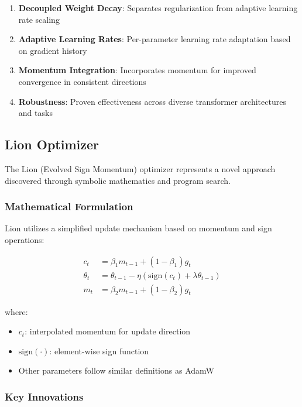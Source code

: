 \begin{enumerate}
    \item \textbf{Decoupled Weight Decay}: Separates regularization from adaptive learning rate scaling
    \item \textbf{Adaptive Learning Rates}: Per-parameter learning rate adaptation based on gradient history
    \item \textbf{Momentum Integration}: Incorporates momentum for improved convergence in consistent directions
    \item \textbf{Robustness}: Proven effectiveness across diverse transformer architectures and tasks
\end{enumerate}

\subsection{Lion Optimizer}

The Lion (Evolved Sign Momentum) optimizer \cite{chen2023symbolic} represents a novel approach discovered through symbolic mathematics and program search.

\subsubsection{Mathematical Formulation}

Lion utilizes a simplified update mechanism based on momentum and sign operations:

\begin{align}
c_t &= \beta_1 m_{t-1} + (1 - \beta_1) g_t \\
\theta_t &= \theta_{t-1} - \eta \left( \text{sign}(c_t) + \lambda \theta_{t-1} \right) \\
m_t &= \beta_2 m_{t-1} + (1 - \beta_2) g_t
\end{align}

where:
\begin{itemize}
    \item $c_t$: interpolated momentum for update direction
    \item $\text{sign}(\cdot)$: element-wise sign function
    \item Other parameters follow similar definitions as AdamW
\end{itemize}

\subsubsection{Key Innovations}

